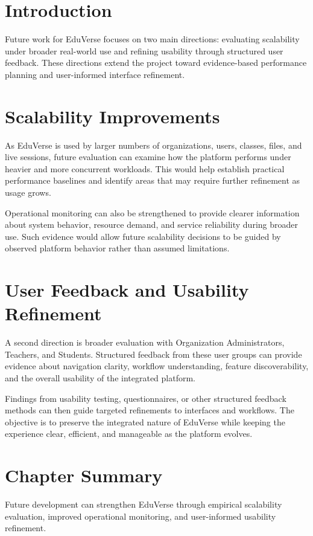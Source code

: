 
\section{Introduction}\label{sec:future_work_introduction}

Future work for EduVerse focuses on two main directions: evaluating scalability
under broader real-world use and refining usability through structured user
feedback. These directions extend the project toward evidence-based performance
planning and user-informed interface refinement.

\section{Scalability Improvements}\label{sec:scalability_improvements}

As EduVerse is used by larger numbers of organizations, users, classes, files,
and live sessions, future evaluation can examine how the platform performs
under heavier and more concurrent workloads. This would help establish practical
performance baselines and identify areas that may require further refinement as
usage grows.

Operational monitoring can also be strengthened to provide clearer information
about system behavior, resource demand, and service reliability during broader
use. Such evidence would allow future scalability decisions to be guided by
observed platform behavior rather than assumed limitations.

\section{User Feedback and Usability Refinement}
\label{sec:user_feedback_usability_refinement}

A second direction is broader evaluation with Organization Administrators,
Teachers, and Students. Structured feedback from these user groups can provide
evidence about navigation clarity, workflow understanding, feature
discoverability, and the overall usability of the integrated platform.

Findings from usability testing, questionnaires, or other structured feedback
methods can then guide targeted refinements to interfaces and workflows. The
objective is to preserve the integrated nature of EduVerse while keeping the
experience clear, efficient, and manageable as the platform evolves.

\enlargethispage{\baselineskip}
\section{Chapter Summary}\label{sec:future_work_summary}

Future development can strengthen EduVerse through empirical scalability
evaluation, improved operational monitoring, and user-informed usability
refinement.
